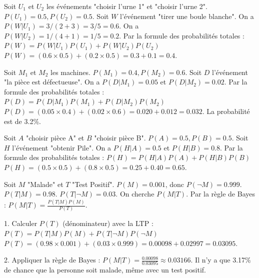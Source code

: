 
\begin{correctionbox}
Soit $U_1$ et $U_2$ les événements "choisir l'urne 1" et "choisir l'urne 2". $P(U_1)=0.5, P(U_2)=0.5$.
Soit $W$ l'événement "tirer une boule blanche".
On a $P(W|U_1) = 3 / (2+3) = 3/5 = 0.6$.
On a $P(W|U_2) = 1 / (4+1) = 1/5 = 0.2$.
Par la formule des probabilités totales :
$P(W) = P(W|U_1)P(U_1) + P(W|U_2)P(U_2)$
$P(W) = (0.6 \times 0.5) + (0.2 \times 0.5) = 0.3 + 0.1 = 0.4$.
\end{correctionbox}

\begin{correctionbox}
Soit $M_1$ et $M_2$ les machines. $P(M_1)=0.4, P(M_2)=0.6$.
Soit $D$ l'événement "la pièce est défectueuse".
On a $P(D|M_1) = 0.05$ et $P(D|M_2) = 0.02$.
Par la formule des probabilités totales :
$P(D) = P(D|M_1)P(M_1) + P(D|M_2)P(M_2)$
$P(D) = (0.05 \times 0.4) + (0.02 \times 0.6) = 0.020 + 0.012 = 0.032$.
La probabilité est de 3.2\%.
\end{correctionbox}

\begin{correctionbox}
Soit $A$ "choisir pièce A" et $B$ "choisir pièce B". $P(A)=0.5, P(B)=0.5$.
Soit $H$ l'événement "obtenir Pile".
On a $P(H|A) = 0.5$ et $P(H|B) = 0.8$.
Par la formule des probabilités totales :
$P(H) = P(H|A)P(A) + P(H|B)P(B)$
$P(H) = (0.5 \times 0.5) + (0.8 \times 0.5) = 0.25 + 0.40 = 0.65$.
\end{correctionbox}


\begin{correctionbox}
Soit $M$ "Malade" et $T$ "Test Positif".
$P(M) = 0.001$, donc $P(\neg M) = 0.999$.
$P(T|M) = 0.98$.
$P(T|\neg M) = 0.03$.
On cherche $P(M|T)$. Par la règle de Bayes : $P(M|T) = \frac{P(T|M)P(M)}{P(T)}$.

1.  Calculer $P(T)$ (dénominateur) avec la LTP :
    $P(T) = P(T|M)P(M) + P(T|\neg M)P(\neg M)$
    $P(T) = (0.98 \times 0.001) + (0.03 \times 0.999) = 0.00098 + 0.02997 = 0.03095$.

2.  Appliquer la règle de Bayes :
    $P(M|T) = \frac{0.00098}{0.03095} \approx 0.03166$.
    Il n'y a que 3.17\% de chance que la personne soit malade, même avec un test positif.
\end{correctionbox}

